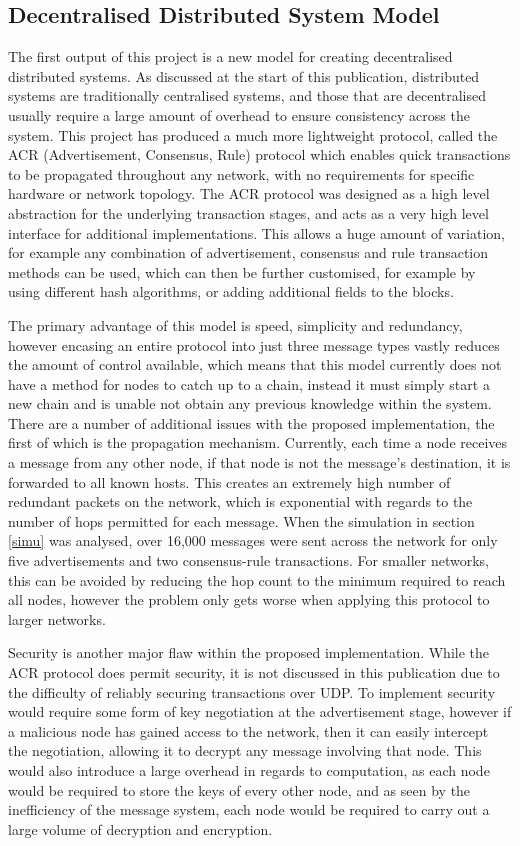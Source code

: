 \documentclass[a4paper, 11pt]{report}
\begin{document}
\subsection{Decentralised Distributed System Model}
The first output of this project is a new model for creating decentralised distributed systems. As discussed at the start of this publication, distributed systems are traditionally centralised systems, and those that are decentralised usually require a large amount of overhead to ensure consistency across the system. This project has produced a much more lightweight protocol, called the ACR (Advertisement, Consensus, Rule) protocol which enables quick transactions to be propagated throughout any network, with no requirements for specific hardware or network topology. The ACR protocol was designed as a high level abstraction for the underlying transaction stages, and acts as a very high level interface for additional implementations. This allows a huge amount of variation, for example any combination of advertisement, consensus and rule transaction methods can be used, which can then be further customised, for example by using different hash algorithms, or adding additional fields to the blocks.

The primary advantage of this model is speed, simplicity and redundancy, however encasing an entire protocol into just three message types vastly reduces the amount of control available, which means that this model currently does not have a method for nodes to catch up to a chain, instead it must simply start a new chain and is unable not obtain any previous knowledge within the system. There are a number of additional issues with the proposed implementation, the first of which is the propagation mechanism. Currently, each time a node receives a message from any other node, if that node is not the message's destination, it is forwarded to all known hosts. This creates an extremely high number of redundant packets on the network, which is exponential with regards to the number of hops permitted for each message. When the simulation in section \ref{simu} was analysed, over 16,000 messages were sent across the network for only five advertisements and two consensus-rule transactions. For smaller networks, this can be avoided by reducing the hop count to the minimum required to reach all nodes, however the problem only gets worse when applying this protocol to larger networks.

Security is another major flaw within the proposed implementation. While the ACR protocol does permit security, it is not discussed in this publication due to the difficulty of reliably securing transactions over \acrshort{UDP}. To implement security would require some form of key negotiation at the advertisement stage, however if a malicious node has gained access to the network, then it can easily intercept the negotiation, allowing it to decrypt any message involving that node. This would also introduce a large overhead in regards to computation, as each node would be required to store the keys of every other node, and as seen by the inefficiency of the message system, each node would be required to carry out a large volume of decryption and encryption.
\end{document}

